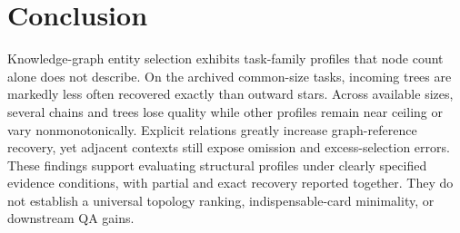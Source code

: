 \section{Conclusion}
\label{sec:conclusion}
Knowledge-graph entity selection exhibits task-family profiles that node count alone does not describe. On the archived common-size tasks, incoming trees are markedly less often recovered exactly than outward stars. Across available sizes, several chains and trees lose quality while other profiles remain near ceiling or vary nonmonotonically. Explicit relations greatly increase graph-reference recovery, yet adjacent contexts still expose omission and excess-selection errors. These findings support evaluating structural profiles under clearly specified evidence conditions, with partial and exact recovery reported together. They do not establish a universal topology ranking, indispensable-card minimality, or downstream QA gains.
